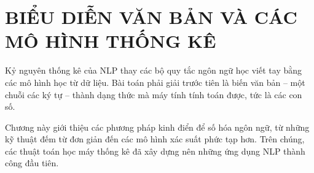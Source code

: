 \chapter{BIỂU DIỄN VĂN BẢN VÀ CÁC MÔ HÌNH THỐNG KÊ}
\label{chap:bieu_dien_van_ban}

Kỷ nguyên thống kê của NLP thay các bộ quy tắc ngôn ngữ học viết tay bằng các mô hình học từ dữ liệu. Bài toán phải giải trước tiên là biến văn bản -- một chuỗi các ký tự -- thành dạng thức mà máy tính tính toán được, tức là các con số.

Chương này giới thiệu các phương pháp kinh điển để số hóa ngôn ngữ, từ những kỹ thuật đếm từ đơn giản đến các mô hình xác suất phức tạp hơn. Trên chúng, các thuật toán học máy thống kê đã xây dựng nên những ứng dụng NLP thành công đầu tiên.